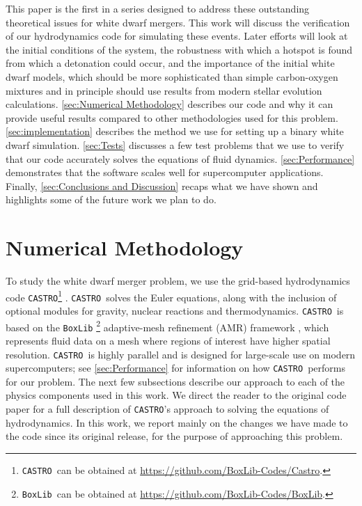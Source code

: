 \documentclass[iop]{../emulateapj}
\newcommand{\boxlib}{\texttt{BoxLib}}
\newcommand{\castro}{\texttt{CASTRO}}
\begin{document}
This paper is the first in a series designed to address these
outstanding theoretical issues for white dwarf mergers. This work will
discuss the verification of our hydrodynamics code for simulating
these events. Later efforts will look at the initial conditions of the
system, the robustness with which a hotspot is found from which a
detonation could occur, and the importance of the initial white dwarf
models, which should be more sophisticated than simple carbon-oxygen
mixtures and in principle should use results from modern stellar
evolution calculations. \autoref{sec:Numerical Methodology}
describes our code and why it can provide useful results compared to
other methodologies used for this problem. 
\autoref{sec:implementation} describes the method we use for setting up a
binary white dwarf simulation. \autoref{sec:Tests} discusses a few
test problems that we use to verify that our code accurately
solves the equations of fluid dynamics. \autoref{sec:Performance}
demonstrates that the software scales well for supercomputer
applications. Finally, \autoref{sec:Conclusions and Discussion}
recaps what we have shown and highlights some of the future work we
plan to do.

\section{Numerical Methodology}\label{sec:Numerical Methodology}

To study the white dwarf merger problem, we use the grid-based
hydrodynamics code \castro\footnote{\castro\ can be obtained at \url{https://github.com/BoxLib-Codes/Castro}.} \citep{castro}.
\castro\ solves the Euler
equations, along with the inclusion of optional modules for gravity,
nuclear reactions and thermodynamics. \castro\ is based on the \boxlib
\footnote{\boxlib\ can be obtained at \url{https://github.com/BoxLib-Codes/BoxLib}.}
adaptive-mesh refinement (AMR) framework \citep{rendleman:2000}, which
represents fluid data on a mesh where regions of interest have higher
spatial resolution. \castro\ is highly parallel and is designed for
large-scale use on modern supercomputers; see 
\autoref{sec:Performance} for information on how \castro\ performs for our
problem. The next few subsections describe our approach to each of the
physics components used in this work. We direct the reader to the
original code paper for a full description of \castro's approach to
solving the equations of hydrodynamics. In this work, we report mainly
on the changes we have made to the code since its original release,
for the purpose of approaching this problem.
\end{document}
